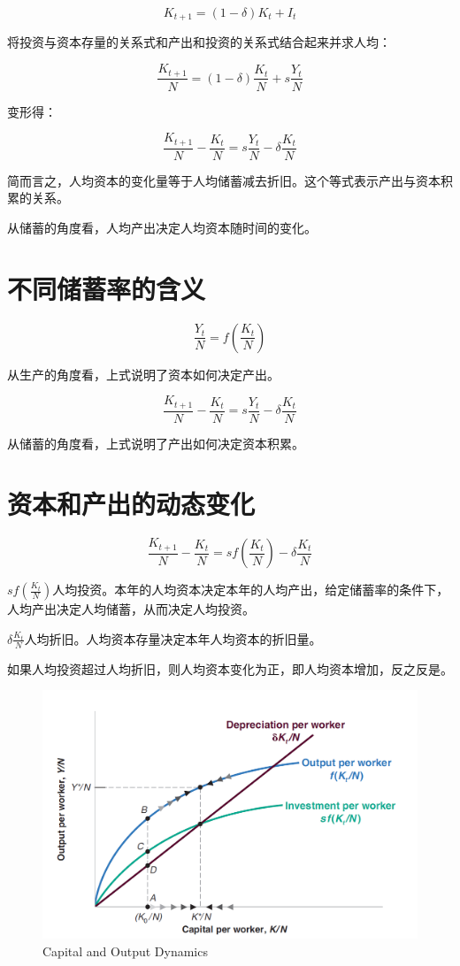 \documentclass{article}
\begin{document}
\[
K_{t+1}=(1-\delta)K_t+I_t
\]

将投资与资本存量的关系式和产出和投资的关系式结合起来并求人均：

\[
\frac{K_{t+1}}{N}=(1-\delta)\frac{K_t}{N}+s\frac{Y_t}{N}
\]

变形得：

\[
\frac{K_{t+1}}{N}-\frac{K_t}{N}=s\frac{Y_t}{N}-\delta\frac{K_t}{N}
\]

简而言之，人均资本的变化量等于人均储蓄减去折旧。这个等式表示产出与资本积累的关系。

从储蓄的角度看，人均产出决定人均资本随时间的变化。

\section{不同储蓄率的含义}

\[
\frac{Y_t}{N}=f(\frac{K_t}{N})
\]

从生产的角度看，上式说明了资本如何决定产出。

\[
\frac{K_{t+1}}{N}-\frac{K_t}{N}=s\frac{Y_t}{N}-\delta\frac{K_t}{N}
\]

从储蓄的角度看，上式说明了产出如何决定资本积累。

\section{资本和产出的动态变化}

\[
\frac{K_{t+1}}{N}-\frac{K_t}{N}=sf(\frac{K_t}{N})-\delta\frac{K_t}{N}
\]

$ sf(\frac{K_t}{N}) $人均投资。本年的人均资本决定本年的人均产出，给定储蓄率的条件下，人均产出决定人均储蓄，从而决定人均投资。

$ \delta\frac{K_t}{N} $人均折旧。人均资本存量决定本年人均资本的折旧量。

如果人均投资超过人均折旧，则人均资本变化为正，即人均资本增加，反之反是。

\begin{figure}[H] %
	\centering %
	\includegraphics[width=1\textwidth]{11_2} %
	\caption{Capital and Output
		Dynamics} %
	\label{Fig.main3} %
\end{figure}
\end{document}
